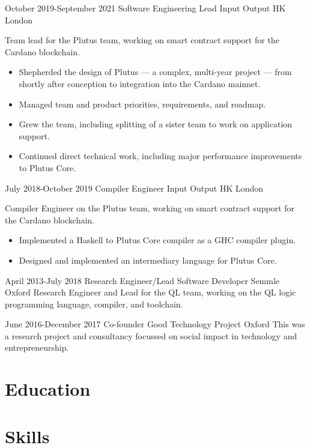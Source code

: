\documentclass[12pt,a4paper,sans]{moderncv}
\begin{document}
\cventry
{October 2019-September 2021}
{Software Engineering Lead}
{Input Output HK}
{London}
{}
{
  Team lead for the Plutus team, working on smart contract support for the Cardano blockchain.
  \begin{itemize}
    \item Shepherded the design of Plutus --- a  complex, multi-year project --- from shortly after conception to integration into the Cardano mainnet.
    \item Managed team and product priorities, requirements, and roadmap.
    \item Grew the team, including splitting of a sister team to work on application support.
    \item Continued direct technical work, including major performance improvements to Plutus Core.
  \end{itemize}
}

\cventry
{July 2018-October 2019}
{Compiler Engineer}
{Input Output HK}
{London}
{}
{
  Compiler Engineer on the Plutus team, working on smart contract support for the Cardano blockchain.
  \begin{itemize}
    \item Implemented a Haskell to Plutus Core compiler as a GHC compiler plugin.
    \item Designed and implemented an intermediary language for Plutus Core.
  \end{itemize}
}

\cventry
{April 2013-July 2018}
{Research Engineer/Lead Software Developer}
{Semmle}
{Oxford}
{}
{
  Research Engineer and Lead for the QL team, working on the QL logic programming language, compiler, and toolchain.
}

\cventry
{June 2016-December 2017}
{Co-founder}
{Good Technology Project}
{Oxford}
{}
{
  This was a research project and consultancy focussed on social impact in technology and entrepreneurship. 
}

\section{Education}

\section{Skills}
\end{document}
